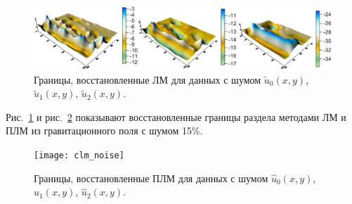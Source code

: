\begin{figure}[h]
	\centering
	\includegraphics[width=\textwidth]{lm_noise}
	\caption{Границы, восстановленные ЛМ для данных с шумом $\tilde{u}_0(x,y)$, $\tilde{u}_1(x,y)$, $\tilde{u}_2(x,y)$.}
	\label{fig:noise_rlmm}
\end{figure}
Рис.~\ref{fig:noise_rlmm} и рис.~\ref{fig:noise_rclmm} показывают восстановленные границы раздела методами ЛМ и ПЛМ из гравитационного поля с шумом 15\%.
\begin{figure}[h]
	\centering
	\texttt{[image: clm\_noise]}
	\caption{Границы, восстановленные ПЛМ для данных с шумом $\hat{u}_0(x,y)$, $\hat{u}_1(x,y)$, $\hat{u}_2(x,y)$.}
	\label{fig:noise_rclmm}
\end{figure}
